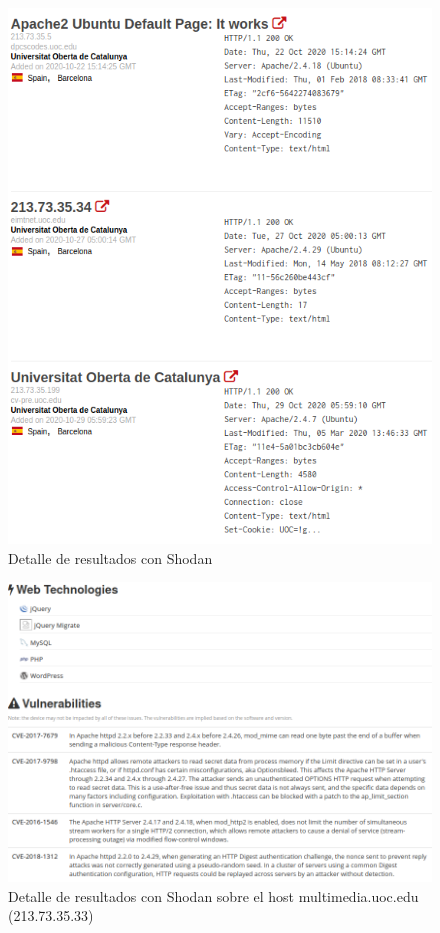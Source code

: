 \documentclass[10pt,a4paper]{article}
\begin{document}
\begin{figure}[h!]
  \includegraphics[scale=0.25]{shodan2.png}
  \caption{Detalle de resultados con Shodan}
  \label{fig:otg-info-002-1}
\end{figure}

\begin{figure}[h!]
  \centering
  \includegraphics[scale=0.25]{shodan3.png}
  \caption{Detalle de resultados con Shodan sobre el host multimedia.uoc.edu (213.73.35.33)}
  \label{fig:otg-info-002-2}
\end{figure}
\end{document}
